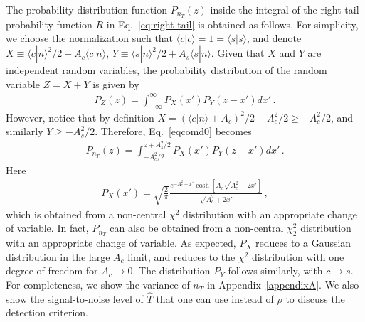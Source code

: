 \documentclass[prd,aps,floatfix,superscriptaddress,nofootinbib,twocolumn,10pt,English]{revtex4-1}
\begin{document}
The probability distribution function $P_{n_T}(z)$ inside the integral of 
the right-tail probability function $R$ in Eq.~\eqref{eq:right-tail}
is obtained as follows. For simplicity,
we choose the normalization such that $\langle c | c \rangle =1= \langle
s | s \rangle $, and denote $X \equiv \langle c | n \rangle^2/2 +
A_c \langle c | n \rangle$, $Y \equiv \langle s | n \rangle^2/2 + A_s
\langle s | n \rangle$. Given that $X$ and $Y$ are independent
  random variables, the probability distribution of the random
  variable $Z=X+Y$ is given by
\begin{align}\label{eqcomd0}
P_{Z} (z) = \int^{\infty}_{-\infty} P_X(x') P_Y(z-x') d x'\,.
\end{align}
However, notice that by definition $X = (\langle c | n
  \rangle+A_c)^2/2 -A^2_c/2 \ge -A^2_c/2$, and similarly $Y \ge
  -A^2_s/2$. Therefore, Eq.~\eqref{eqcomd0} becomes
%
\begin{align}\label{eqcomd}
P_{n_T} (z) = \int^{z+A^2_s/2}_{-A^2_c/2} P_X(x') P_Y(z-x') d x'\,.
\end{align}
Here
\begin{align}
P_X(x') = \sqrt{\frac{2}{\pi}}\frac{e^{-A^2_c-x'} \cosh [A_c \sqrt{A^2_c+2 x'}]}{\sqrt{A^2_c+2 x'}}\,,
\end{align}
which is obtained from a non-central $\chi^2$ distribution with an appropriate change of variable. 
In fact, $P_{n_T}$ can also be obtained from a non-central $\chi^2_2$ distribution with an appropriate change of variable.
As expected, $P_X$ reduces to a Gaussian distribution in the large $A_c$ limit, and reduces to 
the $\chi^2$ distribution with one degree of freedom for $A_c \to 0$. 
The distribution $P_Y $ follows similarly, with $c \rightarrow s$. 
For completeness, we show the variance of $n_T$ in Appendix~\ref{appendixA}. 
We also show 
the signal-to-noise level of $\hat T$ that one can use instead of $\rho$ to discuss the 
detection criterion. 
\end{document}
